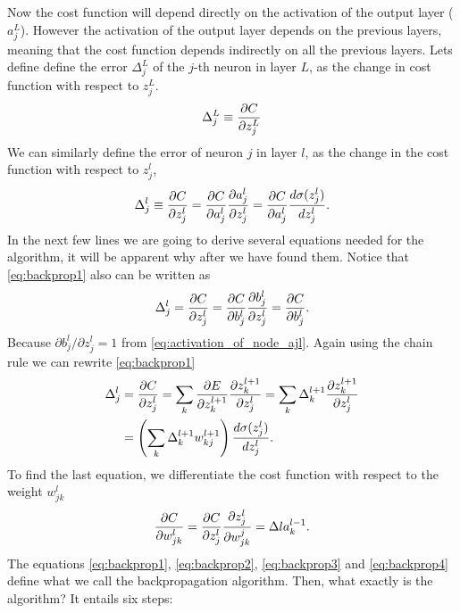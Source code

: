 \documentclass[12pt]{extarticle}
\begin{document}
Now the cost function will depend directly on the activation of the output layer ($a^L_j$). However the activation of the output layer depends on the previous layers, meaning that the cost function depends indirectly on all the previous layers. Lets define define the error $\Delta_j^L$ of the $j$-th neuron in layer $L$, as the change in cost function with respect to $z^L_j$.
\begin{align}
	\Delta_j^L \equiv \frac{\partial C}{\partial z_j^L}
	\label{eq:backprop0}
\end{align}
We can similarly define the error of neuron $j$ in layer $l$, as the change in the cost function with respect to $z_j^l$,
\begin{align}
	\Delta_j^l \equiv \frac{\partial C}{\partial z_j^l} = \frac{\partial C}{\partial a_j^l}\frac{\partial a_j^l}{\partial z^l_j} = \frac{\partial C}{\partial a_j^l}\frac{d \sigma(z^l_j)}{d z^l_j}.
	\label{eq:backprop1}
\end{align}
In the next few lines we are going to derive several equations needed for the algorithm, it will be apparent why after we have found them. Notice that \eqref{eq:backprop1} also can be written as
\begin{align}
	\Delta_j^l = \frac{\partial C}{\partial z_j^l} = \frac{\partial C}{\partial b_j^l}\frac{\partial b_j^l}{\partial z^l_j} = \frac{\partial C}{\partial b_j^l}.
	\label{eq:backprop2}
\end{align}
Because $\partial b_j^l/\partial z^l_j = 1$ from \eqref{eq:activation_of_node_ajl}. Again using the chain rule we can rewrite \eqref{eq:backprop1}
\begin{align}
	\Delta_j^l & = \frac{\partial C}{\partial z_j^l} = \sum_{k} \frac{\partial E}{\partial z_k^{l+1}}\frac{\partial z_k^{l+1}}{\partial z^l_j} = \sum_{k} \Delta_k^{l+1}\frac{\partial z_k^{l+1}}{\partial z^l_j} \nonumber \\
	           & = \left(\sum_{k} \Delta_k^{l+1} w_{kj}^{l+1}\right)\frac{d \sigma(z^l_j)}{d z^l_j}.
	\label{eq:backprop3}
\end{align}
To find the last equation, we differentiate the cost function with respect to the weight $w^l_{jk}$
\begin{align}
	\frac{\partial C}{\partial w_{jk}^l} = \frac{\partial C}{\partial z_j^l}\frac{\partial z_j^l}{\partial w_{jk}^j} = \Delta l a_k^{l-1}.
	\label{eq:backprop4}
\end{align}
The equations \eqref{eq:backprop1}, \eqref{eq:backprop2}, \eqref{eq:backprop3} and \eqref{eq:backprop4} define what we call the backpropagation algorithm. Then, what exactly is the algorithm? It entails six steps:
\end{document}
